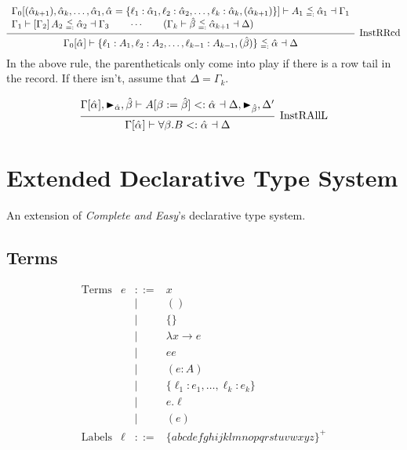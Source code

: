 \documentclass{article}
\newcommand{\rcd}[1]{\{#1\}}
\newcommand{\define}{::=}
\newcommand{\marker}[1]{\RHD_{#1}}
\newcommand{\subsume}{<:}
\newcommand{\prjSymbol}{.}
\newcommand{\instRSymbol}{\;\substack{<\\=:}\;}
\newcommand{\ev}{\hat}
\newcommand{\spc}{\qquad}
\newcommand{\apply}[1]{\left[#1\right]}
\newcommand{\eva}[1][]{\ev \alpha_{#1}}
\newcommand{\evb}{\ev \beta}
\newcommand{\subsumes}[4]{#1 \vdash #2 \subsume #3 \dashv #4}
\newcommand{\instR}[4]{#1 \vdash #2 \instRSymbol #3 \dashv #4}
\newcommand{\deduct}[3][]
{
  \begin{prooftree}
    \hypo{#2}
    \infer1[\text{#1}]{#3}
  \end{prooftree}
}
\begin{document}
\[
  \deduct[InstRRcd]
  {
    \begin{array}{l}
     \instR{\Gamma_0[(\eva[k+1]), \eva[k], \dots, \eva[1], \eva=\{\ell_1 : \eva[1],
      \ell_2 : \eva[2], \dots, \ell_k : \eva[k], (\eva[k+1])\}]}{A_1}{\eva[1]}{\Gamma_1} \\
    \instR{\Gamma_1}{\apply{\Gamma_2} A_2}{\eva[2]}{\Gamma_3} \spc \cdots \spc
     (\instR{\Gamma_k}{\evb}{\eva[k+1]}{\Delta})
  \end{array}
  }
  {\instR{\Gamma_0[\eva]}{\{\ell_1:A_1, \ell_2 : A_2, \dots, \ell_{k-1} : A_{k-1}, (\evb)\}}{\eva}{\Delta}}
\]
In the above rule, the parentheticals only come into play if there is a row tail
in the record. If there isn't, assume that \(\Delta = \Gamma_k\).

\[
  \deduct[InstRAllL]
  { \subsumes{\Gamma[\eva], \marker{\ev\alpha}, \evb}{A[\beta := \evb]}{\eva}{\Delta, \marker{\evb}, \Delta'} }
  { \subsumes{\Gamma[\eva]}{\forall \beta. B}{\eva}{\Delta} }
\]


\section{Extended Declarative Type System}
An extension of \emph{Complete and Easy}'s declarative type system.

\subsection{Terms}

\[
  \begin{array}{llcl}
    \text{Terms} & e & \define & x \\
                 & & | & () \\
                 & & | & \rcd{} \\
                 & & | & \lambda x \to e  \\
                 & & | & e e \\
                 & & | & (e : A) \\
                 & & | & \rcd{\ell_1 : e_1, \dots, \ell_k : e_k} \\
                 & & | & e \prjSymbol \ell \\
                 & & | & (e) \\
   \text{Labels} & \ell & \define & \{abcdefghijklmnopqrstuvwxyz\}^+
  \end{array}
\]
\end{document}
